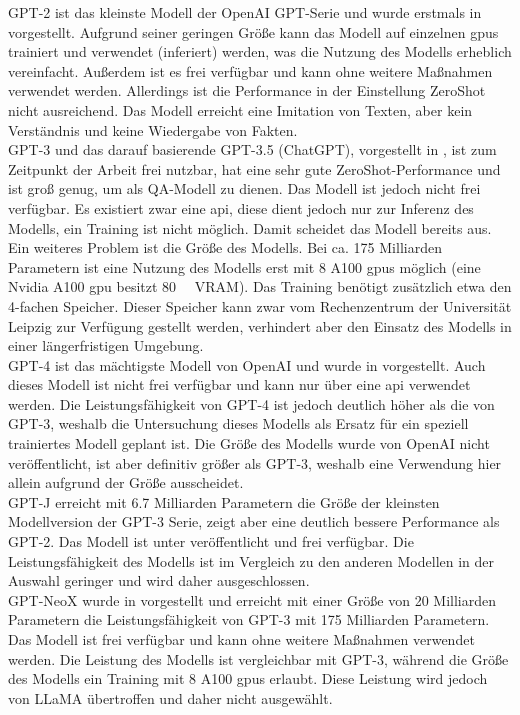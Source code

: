 GPT-2 ist das kleinste Modell der OpenAI GPT-Serie und wurde erstmals in \citet{gpt2} vorgestellt.
Aufgrund seiner geringen Größe kann das Modell auf einzelnen \ac{gpu}s trainiert und verwendet (inferiert) werden, was die Nutzung des Modells erheblich vereinfacht.
Außerdem ist es frei verfügbar und kann ohne weitere Maßnahmen verwendet werden.
Allerdings ist die Performance in der Einstellung ZeroShot nicht ausreichend.
Das Modell erreicht eine Imitation von Texten, aber kein Verständnis und keine Wiedergabe von Fakten.\\

GPT-3 und das darauf basierende GPT-3.5 (ChatGPT), vorgestellt in \citet{gpt3}, ist zum Zeitpunkt der Arbeit frei nutzbar, hat eine sehr gute ZeroShot-Performance und ist groß genug, um als QA-Modell zu dienen.
Das Modell ist jedoch nicht frei verfügbar.
Es existiert zwar eine \ac{api}, diese dient jedoch nur zur Inferenz des Modells, ein Training ist nicht möglich.
Damit scheidet das Modell bereits aus.
Ein weiteres Problem ist die Größe des Modells.
Bei ca. 175 Milliarden Parametern ist eine Nutzung des Modells erst mit 8 A100 \ac{gpu}s möglich (eine Nvidia A100 \ac{gpu} besitzt \SI{80}{\giga\byte} VRAM).
Das Training benötigt zusätzlich etwa den 4-fachen Speicher.
Dieser Speicher kann zwar vom Rechenzentrum der Universität Leipzig zur Verfügung gestellt werden, verhindert aber den Einsatz des Modells in einer längerfristigen Umgebung.\\

GPT-4 ist das mächtigste Modell von OpenAI und wurde in \citet{gpt4} vorgestellt.
Auch dieses Modell ist nicht frei verfügbar und kann nur über eine \ac{api} verwendet werden.
Die Leistungsfähigkeit von GPT-4 ist jedoch deutlich höher als die von GPT-3, weshalb die Untersuchung dieses Modells als Ersatz für ein speziell trainiertes Modell geplant ist.
Die Größe des Modells wurde von OpenAI nicht veröffentlicht, ist aber definitiv größer als GPT-3, weshalb eine Verwendung hier allein aufgrund der Größe ausscheidet.\\

GPT-J erreicht mit \SI{6,7}{} Milliarden Parametern die Größe der kleinsten Modellversion der GPT-3 Serie, zeigt aber eine deutlich bessere Performance als GPT-2.
Das Modell ist unter \citet{gptj} veröffentlicht und frei verfügbar.
Die Leistungsfähigkeit des Modells ist im Vergleich zu den anderen Modellen in der Auswahl geringer und wird daher ausgeschlossen.\\

GPT-NeoX wurde in \citet{gpt_neox} vorgestellt und erreicht mit einer Größe von 20 Milliarden Parametern die Leistungsfähigkeit von GPT-3 mit 175 Milliarden Parametern.
Das Modell ist frei verfügbar und kann ohne weitere Maßnahmen verwendet werden.
Die Leistung des Modells ist vergleichbar mit GPT-3, während die Größe des Modells ein Training mit 8 A100 \ac{gpu}s erlaubt.
Diese Leistung wird jedoch von LLaMA übertroffen und daher nicht ausgewählt.\\

